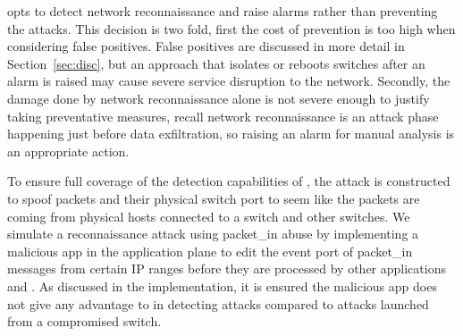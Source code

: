 \name opts to detect network reconnaissance and raise alarms rather than
preventing the attacks. This decision is two fold, first the cost of 
prevention is too high when considering false positives. False positives 
are discussed in more detail in Section~\ref{sec:disc}, but an approach
that isolates or reboots switches after an alarm is raised may cause 
severe service disruption to the network. Secondly, the damage done by 
network reconnaissance alone is not severe enough to justify taking 
preventative measures, recall network reconnaissance is an attack
phase happening just before data exfiltration, so raising an alarm for
manual analysis is an appropriate action. 

 To ensure full coverage of the
detection capabilities of \name, the attack is constructed to spoof
packets and their physical switch port to seem like the packets are
coming from physical hosts connected to a switch and other switches. We
simulate a reconnaissance attack using packet\_in abuse by implementing
a malicious app in the application plane to edit the event port of 
packet\_in messages from certain IP ranges before they are processed by
other applications and \name. As discussed in the implementation, it is 
ensured the malicious app does not give any advantage to \name in
detecting attacks compared to attacks launched from a compromised switch.
